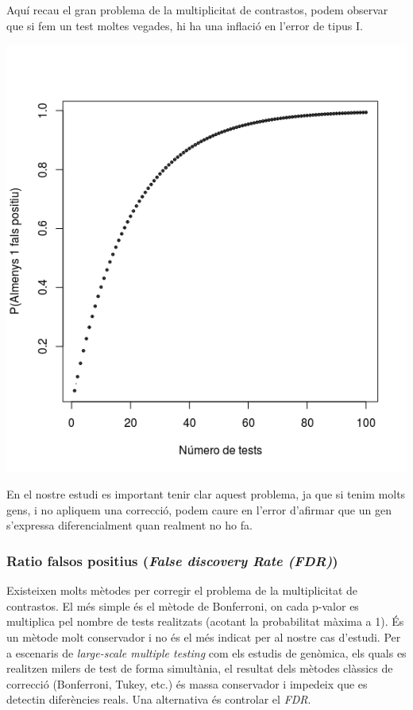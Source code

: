 \documentclass[english]{article}
\begin{document}
Aquí recau el gran problema de la multiplicitat de contrastos, podem observar que si fem un test moltes vegades, hi ha una inflació en l'error de tipus I.
\begin{center}
\includegraphics[scale=0.5]{FalsPositiu.png}
\end{center}
En el nostre estudi es important tenir clar aquest problema, ja que si tenim molts gens, i no apliquem una correcció, podem caure en l'error d'afirmar que un gen s'expressa diferencialment quan realment no ho fa.
\subsubsection{Ratio falsos positius (\emph{False discovery Rate (FDR)})}
Existeixen molts mètodes per corregir el problema de la multiplicitat de contrastos. El més simple és el mètode de Bonferroni, on cada p-valor es multiplica pel nombre de tests realitzats (acotant la probabilitat màxima a 1). És un mètode molt conservador i no és el més indicat per al nostre cas d'estudi.
Per a escenaris de \textit{large-scale multiple testing} com els estudis de genòmica, els quals es realitzen milers de test de forma simultània, el resultat dels mètodes clàssics de correcció (Bonferroni, Tukey, etc.) és massa conservador i impedeix que es detectin diferències reals. Una alternativa és controlar el \emph{FDR}.
\\
\end{document}

